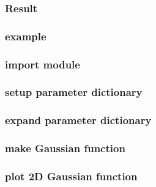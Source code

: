 \begin{frame} \frametitle{Result}


\end{frame}
\cwpnote{}

\begin{frame}

  \vfill
  \vfill
  \vfill
  \vfill
  \vfill

\end{frame}
\cwpnote{}


\begin{frame} \frametitle{example}
  \vfill
\end{frame}
\cwpnote{}



\begin{frame} \frametitle{import module}
\end{frame}
\cwpnote{}

\begin{frame} \frametitle{setup parameter dictionary}
\end{frame}
\cwpnote{}

\begin{frame} \frametitle{expand parameter dictionary}
\end{frame}
\cwpnote{}


\begin{frame} \frametitle{make Gaussian function}
\end{frame}
\cwpnote{}

\begin{frame} \frametitle{plot 2D Gaussian function}
\end{frame}
\cwpnote{}

